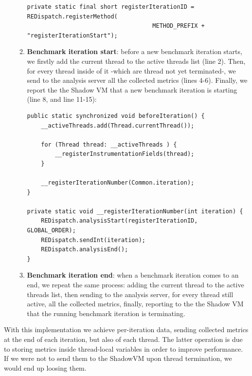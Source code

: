 \documentclass[]{usiinfthesis}
\begin{document}
\begin{itemize}
\begin{enumerate}
        \vspace*{0.25cm}
        \begin{verbatim}
private static final short registerIterationID = REDispatch.registerMethod(
                                    METHOD_PREFIX + "registerIterationStart");
    \end{verbatim}
    \vspace*{0.25cm}
    \item \textbf{Benchmark iteration start}: before a new benchmark iteration starts, we firstly add the current thread to the active threads list (line 2). Then, for every thread inside of it -which are thread not yet terminated-, we send to the analysis server all the collected metrics (lines 4-6). Finally, we report the the Shadow VM that a new benchmark iteration is starting (line 8, and line 11-15):
    \vspace*{0.25cm}
        \begin{verbatim}
public static synchronized void beforeIteration() {
    __activeThreads.add(Thread.currentThread());

    for (Thread thread: __activeThreads ) {
        __registerInstrumentationFields(thread);
    }

    __registerIterationNumber(Common.iteration);
}

private static void __registerIterationNumber(int iteration) {
    REDispatch.analysisStart(registerIterationID, GLOBAL_ORDER);
    REDispatch.sendInt(iteration);
    REDispatch.analysisEnd();
}
    \end{verbatim}
    \vspace*{0.25cm}
    \item \textbf{Benchmark iteration end}: when a benchmark iteration comes to an end, we repeat the same process: adding the current thread to the active threads list, then sending to the analysis server, for every thread still active, all the collected metrics, finally, reporting to the the Shadow VM that the running benchmark iteration is terminating.
    \end{enumerate}
\end{itemize}
With this implementation we achieve per-iteration data, sending collected metrics at the end of each iteration, but also of each thread. The latter operation is due to storing metrics inside thread-local variables in order to improve performance. If we were not to send them to the ShadowVM upon thread termination, we would end up loosing them.
\end{document}

